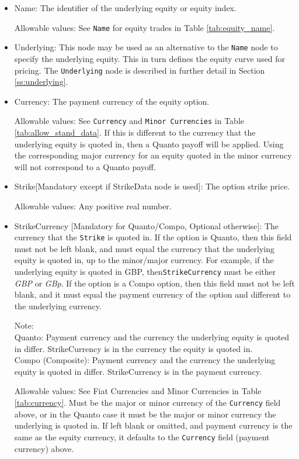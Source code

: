 \begin{itemize}
	\item Name: The identifier of the underlying equity or equity index. 
	
	Allowable values: See \lstinline!Name! for equity trades in Table \ref{tab:equity_name}.
	
	\item Underlying: This node may be used as an alternative to the \lstinline!Name! node to
	specify the underlying equity. This in turn defines the equity curve used for pricing. The
	\lstinline!Underlying! node is described in further detail in Section \ref{ss:underlying}. \\
	
	\item Currency: The payment currency of the equity option. 
	
	Allowable values: See \lstinline!Currency! and \lstinline!Minor Currencies! in Table
	\ref{tab:allow_stand_data}.	If this is different to the currency that the underlying equity
	is quoted in, then a Quanto payoff will be applied. Using the corresponding major currency
	for an equity quoted in the minor currency will not correspond to a Quanto payoff.
	
	\item Strike[Mandatory except if StrikeData node is used]: The option strike price.
	
	Allowable values: Any positive real number.	
	
	\item StrikeCurrency [Mandatory for Quanto/Compo, Optional otherwise]: The currency that the \lstinline!Strike! is quoted in. If
	the option is Quanto, then this field must not be left blank, and must equal the currency
	that the underlying equity is quoted in, up to the minor/major currency. For example, if 
	the underlying equity is quoted in GBP, then\lstinline!StrikeCurrency! must be either
	\emph{GBP} or \emph{GBp}. If the option is a Compo option, then this field must not be 
	left blank, and it must equal the payment currency of the option and different to the 
	underlying currency.
	
	Note:\\
	Quanto: Payment currency and the currency the underlying equity is quoted in differ. StrikeCurrency is in the currency the equity is quoted in.\\
	Compo (Composite): Payment currency and the currency the underlying equity is quoted in differ. StrikeCurrency is in the payment currency.
	
	Allowable values: See Fiat Currencies and Minor Currencies in Table
	\ref{tab:currency}.	Must be the major or minor currency of the \lstinline!Currency!
	field above, or in the Quanto case it must be the major or minor currency the underlying is quoted in. If left blank or omitted, and payment currency is the same as the equity currency, it defaults to the \lstinline!Currency! field (payment currency) above.


\end{itemize}
